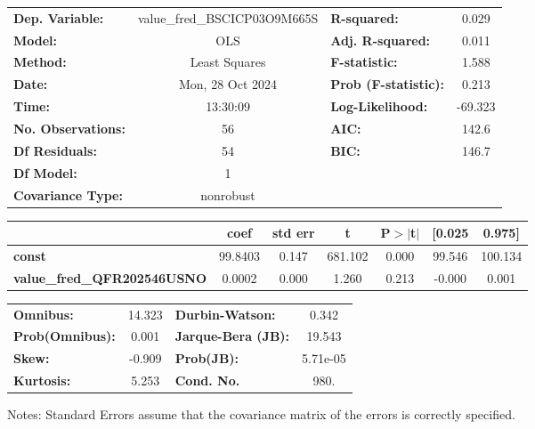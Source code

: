 \begin{center}
\begin{tabular}{lclc}
\toprule
\textbf{Dep. Variable:}             & value\_fred\_BSCICP03O9M665S & \textbf{  R-squared:         } &     0.029   \\
\textbf{Model:}                     &             OLS              & \textbf{  Adj. R-squared:    } &     0.011   \\
\textbf{Method:}                    &        Least Squares         & \textbf{  F-statistic:       } &     1.588   \\
\textbf{Date:}                      &       Mon, 28 Oct 2024       & \textbf{  Prob (F-statistic):} &    0.213    \\
\textbf{Time:}                      &           13:30:09           & \textbf{  Log-Likelihood:    } &   -69.323   \\
\textbf{No. Observations:}          &                56            & \textbf{  AIC:               } &     142.6   \\
\textbf{Df Residuals:}              &                54            & \textbf{  BIC:               } &     146.7   \\
\textbf{Df Model:}                  &                 1            & \textbf{                     } &             \\
\textbf{Covariance Type:}           &          nonrobust           & \textbf{                     } &             \\
\bottomrule
\end{tabular}
\begin{tabular}{lcccccc}
                                    & \textbf{coef} & \textbf{std err} & \textbf{t} & \textbf{P$> |$t$|$} & \textbf{[0.025} & \textbf{0.975]}  \\
\midrule
\textbf{const}                      &      99.8403  &        0.147     &   681.102  &         0.000        &       99.546    &      100.134     \\
\textbf{value\_fred\_QFR202546USNO} &       0.0002  &        0.000     &     1.260  &         0.213        &       -0.000    &        0.001     \\
\bottomrule
\end{tabular}
\begin{tabular}{lclc}
\textbf{Omnibus:}       & 14.323 & \textbf{  Durbin-Watson:     } &    0.342  \\
\textbf{Prob(Omnibus):} &  0.001 & \textbf{  Jarque-Bera (JB):  } &   19.543  \\
\textbf{Skew:}          & -0.909 & \textbf{  Prob(JB):          } & 5.71e-05  \\
\textbf{Kurtosis:}      &  5.253 & \textbf{  Cond. No.          } &     980.  \\
\bottomrule
\end{tabular}
\end{center}

Notes: \newline
 [1] Standard Errors assume that the covariance matrix of the errors is correctly specified.